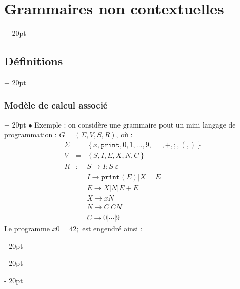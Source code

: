 \documentclass[a4paper, 12pt, twoside]{article}
\newcommand{\lr}[1]{\left( #1 \right)}
\newcommand{\set}[1]{\left\{ #1 \right\}}
\newcommand{\ind}[1][20pt]{\advance\leftskip + #1}
\newcommand{\deind}[1][20pt]{\advance\leftskip - #1}
\newenvironment{indt}[2][20pt]{#2 \par \ind[#1]}{\par \deind} %
\begin{document}
\begin{indt}{\section{Grammaires non contextuelles}}
\begin{indt}{\subsection{Définitions}}
            \vspace{12pt}
            
            \begin{indt}{\subsubsection{Modèle de calcul associé}}
                $\bullet$  Exemple : on considère une grammaire pout un mini langage de programmation : $G = \lr{\Sigma, V, S, R}$, où :
                \[
                    \begin{array}{rcl}
                        \Sigma &=& \set{x, \mathtt{print}, 0, 1, \ldots, 9, =, +, ;, (, )}
                        \\
                        V &=& \set{S, I, E, X, N, C}
                        \\
                        R
                        &:& S \rightarrow I ; S | \varepsilon
                        \\
                        && I \rightarrow \mathtt{print}(E) | X = E
                        \\
                        && E \rightarrow X | N | E + E
                        \\
                        && X \rightarrow xN
                        \\
                        && N \rightarrow C | CN
                        \\
                        && C \rightarrow 0 | \cdots | 9
                    \end{array}
                \]
                Le programme $x0 = 42;$ est engendré ainsi :
                    

\end{indt}
\end{indt}
\end{indt}
\end{document}
